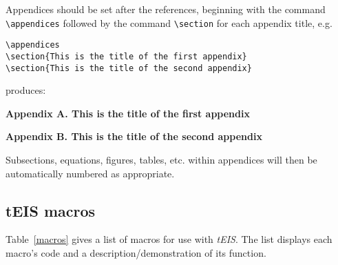 \documentclass[]{tEIS2e}
\theoremstyle{plain}
\theoremstyle{remark}
\begin{document}
Appendices should be set after the references, beginning with the
command \verb"\appendices" followed by the command \verb"\section"
for each appendix title, e.g.
%
\begin{verbatim}
\appendices
\section{This is the title of the first appendix}
\section{This is the title of the second appendix}
\end{verbatim}

\noindent produces:\medskip

\noindent \textbf{Appendix A. This is the title of the first appendix}\vspace{12pt}

\noindent \textbf{Appendix B. This is the title of the second appendix}

\medskip
Subsections, equations, figures, tables, etc. within appendices will then be automatically numbered as appropriate.


\subsection{{\bi tEIS} macros}
Table~\ref{macros} gives a list of macros for use with {\it tEIS}. The list displays each macro's code and a
description/demonstration of its function.

\begin{table} 
\label{macros}
\end{table}
\end{document}
